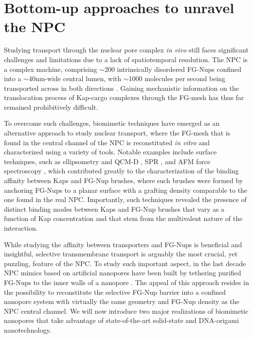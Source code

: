 \section[Bottom-up approaches to unravel the NPC]{Bottom-up approaches to unravel the NPC}
Studying transport through the nuclear pore complex \emph{in vivo} still faces significant challenges and limitations due to a lack of spatiotemporal resolution. The NPC is a complex machine, comprising $\sim$200 intrinsically disordered FG-Nups confined into a $\sim$40nm-wide central lumen, with $\sim$1000 molecules per second being transported across in both directions \cite{Jamali2011}. Gaining mechanistic information on the translocation process of Kap-cargo complexes through the FG-mesh has thus far remained prohibitively difficult. 

To overcome such challenges, biomimetic techniques have emerged as an alternative approach to study nuclear transport, where the FG-mesh that is found in the central channel of the NPC is reconstituted \emph{in vitro} and characterized using a variety of tools. Notable examples include surface techniques, such as ellipsometry and QCM-D \cite{Eisele2010a,Eisele2013a}, SPR \cite{Schoch2012,Kapinos2014}, and AFM force spectroscopy \cite{Lim2007,Schleicher2014}, which contributed greatly to the characterization of the binding affinity between Kaps and FG-Nup brushes, where such brushes were formed by anchoring FG-Nups to a planar surface with a grafting density comparable to the one found in the real NPC. Importantly, such techniques revealed the presence of distinct binding modes between Kaps and FG-Nup brushes that vary as a function of Kap concentration and that stem from the multivalent nature of the interaction.

While studying the affinity between transporters and FG-Nups is beneficial and insightful, selective transmembrane transport is arguably the most crucial, yet puzzling, feature of the NPC. To study such important aspect, in the last decade NPC mimics based on artificial nanopores have been built by tethering purified FG-Nups to the inner walls of a nanopore \cite{Jovanovic-Talisman2009,Kowalczyk2011a}. The appeal of this approach resides in the possibility to reconstitute the selective FG-Nup barrier into a confined nanopore system with virtually the same geometry and FG-Nup density as the NPC central channel. We will now introduce two major realizations of biomimetic nanopores that take advantage of state-of-the-art solid-state and DNA-origami nanotechnology. 


